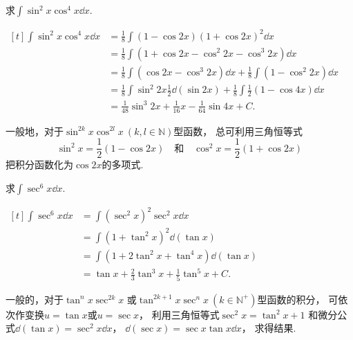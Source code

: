 \begin{example}
求\(\int \sin^2 x \cos^4 x \dd{x}\).
\begin{solution}
\(\begin{aligned}[t]
	\int \sin^2 x \cos^4 x \dd{x}
	&= \frac{1}{8} \int (1 - \cos 2x) (1 + \cos 2x)^2 \dd{x} \\
	&= \frac{1}{8} \int (1 + \cos 2x - \cos^2 2x - \cos^3 2x) \dd{x} \\
	&= \frac{1}{8} \int (\cos 2x - \cos^3 2x) \dd{x}
		+ \frac{1}{8} \int (1 - \cos^2 2x) \dd{x} \\
	&= \frac{1}{8} \int \sin^2 2x \frac{1}{2} \dd(\sin 2x)
		+ \frac{1}{8} \int \frac{1}{2} (1 - \cos 4x) \dd{x} \\
	&= \frac{1}{48} \sin^3 2x + \frac{1}{16} x - \frac{1}{64} \sin 4x + C.
\end{aligned}\)
\end{solution}
\end{example}

\begin{remark}
一般地，对于\(\sin^{2k} x \cos^{2l} x\ (k,l\in\mathbb{N})\)型函数，
总可利用三角恒等式\[
	\sin^2 x = \frac{1}{2} (1 - \cos 2x)
	\quad\text{和}\quad
	\cos^2 x = \frac{1}{2} (1 + \cos 2x)
\]把积分函数化为\(\cos 2x\)的多项式.
\end{remark}

\begin{example}
求\(\int \sec^6x \dd{x}\).
\begin{solution}
\(\begin{aligned}[t]
	\int \sec^6x \dd{x}
	&= \int (\sec^2x)^2 \sec^2x \dd{x} \\
	&= \int (1+\tan^2x)^2 \dd(\tan x) \\
	&= \int (1+2\tan^2x+\tan^4x) \dd(\tan x) \\
	&= \tan x + \frac23 \tan^3x + \frac15 \tan^5x + C.
\end{aligned}\)
\end{solution}
\end{example}

\begin{remark}
一般的，对于\(\tan^n x \sec^{2k} x\)
或\(\tan^{2k+1} x \sec^n x\ (k \in \mathbb{N}^+)\)型函数的积分，
可依次作变换\(u=\tan x\)或\(u=\sec x\)，
利用三角恒等式\(\sec^2 x = \tan^2 x + 1\)
和微分公式\(\dd(\tan x) = \sec^2 x \dd{x}\)，
\(\dd(\sec x) = \sec x \tan x \dd{x}\)，
求得结果.
\end{remark}

